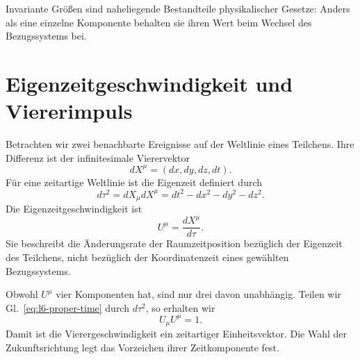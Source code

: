 Invariante Größen sind naheliegende Bestandteile physikalischer Gesetze: Anders als eine einzelne Komponente behalten sie ihren Wert beim Wechsel des Bezugssystems bei.

\section{Eigenzeitgeschwindigkeit und Viererimpuls}

Betrachten wir zwei benachbarte Ereignisse auf der Weltlinie eines Teilchens. Ihre Differenz ist der infinitesimale Vierervektor \begin{equation}
  dX^\mu=(dx,dy,dz,dt).
\end{equation} Für eine zeitartige Weltlinie ist die Eigenzeit definiert durch \begin{equation}
  d\tau^2=dX_\mu dX^\mu
  =dt^2-dx^2-dy^2-dz^2.                                  \label{eq:l6-proper-time}
\end{equation} Die Eigenzeitgeschwindigkeit ist \begin{equation}
  U^\mu=\frac{dX^\mu}{d\tau}.                            \label{eq:l6-four-velocity}
\end{equation} Sie beschreibt die Änderungsrate der Raumzeitposition bezüglich der Eigenzeit des Teilchens, nicht bezüglich der Koordinatenzeit eines gewählten Bezugssystems.

Obwohl \(U^\mu\) vier Komponenten hat, sind nur drei davon unabhängig. Teilen wir Gl.~\eqref{eq:l6-proper-time} durch \(d\tau^2\), so erhalten wir \begin{equation}
  U_\mu U^\mu=1.
\end{equation} Damit ist die Vierergeschwindigkeit ein zeitartiger Einheitsvektor. Die Wahl der Zukunftsrichtung legt das Vorzeichen ihrer Zeitkomponente fest.

\begin{classroomqa}
\end{classroomqa}


